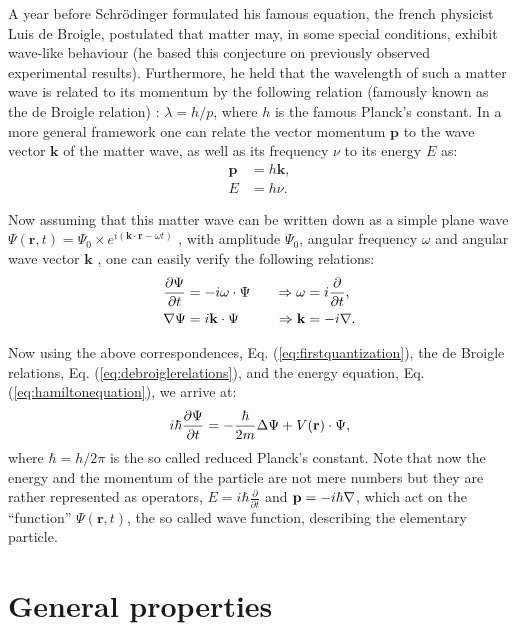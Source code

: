 A year before Schr\"odinger formulated his famous equation, the french physicist Luis de Broigle, postulated that matter may, in some special conditions, exhibit wave-like behaviour (he based this conjecture on previously observed
experimental results). Furthermore, he held that the wavelength of such a matter wave is related to its momentum by the following relation (famously known as the de Broigle relation) : $\lambda = h/p$, where $h$ is the famous Planck's constant. In a more general framework one can relate the vector momentum $\bm{p}$ to the wave vector $\bm{k}$ of the matter wave, as well as its frequency $\nu$ to its energy $E$ as: 
\begin{align}
  \bm{p} &= h \bm{k}, \nonumber \\
  E &= h \nu  \label{eq:debroiglerelations}.
\end{align}

Now assuming that this matter wave can be written down as a simple plane wave $\Psi(\bm{r},t) = \Psi_0 \times e^{i(\bm{k}\cdot \bm{r}-\omega t)}$ , with amplitude $\Psi_0$, angular frequency $\omega$ and angular wave vector $\bm{k}$ , one can easily verify the following relations:
\begin{alignat}{2}
  \frac{\partial \Psi}{\partial t} &= -i\omega \cdot \Psi &\quad \Rightarrow \omega &= i\frac{\partial }{\partial t}, \nonumber \\ 
  \mathbf{\nabla} \Psi &= i\mathbf{k}\cdot\Psi &\quad \Rightarrow \mathbf{k} &= -i\mathbf{\nabla}. \label{eq:firstquantization}
\end{alignat}

Now using the above correspondences, Eq. (\ref{eq:firstquantization}), the de Broigle relations, Eq. (\ref{eq:debroiglerelations}), and the energy equation, Eq. (\ref{eq:hamiltonequation}), we arrive at:
\begin{equation}
  \label{eq:schroedingerequation}
  i\hbar \frac{\partial \Psi}{\partial t} = -\frac{\hbar}{2m}\Delta \Psi + V(\mathbf{r})\cdot \Psi,
\end{equation}
where $\hbar = h/2\pi$ is the so called reduced Planck's constant. Note that now the energy and the momentum of the particle are not mere numbers but they are rather represented as operators, $E = i\hbar \frac{\partial }{\partial t}$ and $\mathbf{p}=-i\hbar \mathbf{\nabla}$, which act on the ``function'' $\Psi(\bm{r},t)$, the so called wave function, describing the elementary particle. 

\section{General properties}

